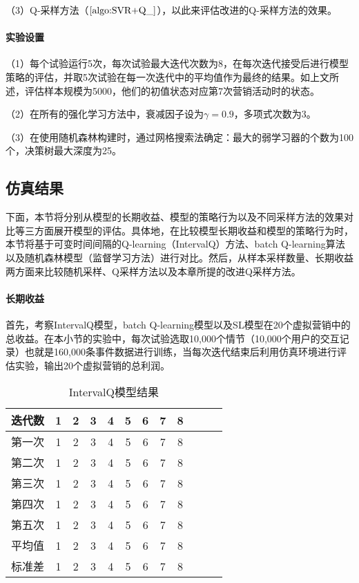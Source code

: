 （3）Q-采样方法（$\ref{algo:SVR+Q_}$），以此来评估改进的Q-采样方法的效果。

\paragraph{实验设置}
（1）每个试验运行5次，每次试验最大迭代次数为8，在每次迭代接受后进行模型策略的评估，并取5次试验在每一次迭代中的平均值作为最终的结果。如上文所述，评估样本规模为5000，他们的初值状态对应第7次营销活动时的状态。

（2）在所有的强化学习方法中，衰减因子设为$\gamma=0.9$，多项式次数为3。

（3）在使用随机森林构建时，通过网格搜索法确定：最大的弱学习器的个数为100个，决策树最大深度为25。

\subsection{仿真结果}
下面，本节将分别从模型的长期收益、模型的策略行为以及不同采样方法的效果对比等三方面展开模型的评估。具体地，在比较模型长期收益和模型的策略行为时，本节将基于可变时间间隔的Q-learning（IntervalQ）方法、batch Q-learning算法以及随机森林模型（监督学习方法）进行对比。然后，从样本采样数量、长期收益两方面来比较随机采样、Q采样方法以及本章所提的改进Q采样方法。

\paragraph{长期收益}
首先，考察IntervalQ模型，batch Q-learning模型以及SL模型在20个虚拟营销中的总收益。在本小节的实验中，每次试验选取10,000个情节（10,000个用户的交互记录）也就是160,000条事件数据进行训练，当每次迭代结束后利用仿真环境进行评估实验，输出20个虚拟营销的总利润。

\begin{table}[htbp]
\centering
\footnotesize
\caption{IntervalQ模型结果}
\label{tab:3result1}
\begin{tabular}{lccccccccccc}  
 \toprule
  迭代数 & 1&2 &3 &4 &5 &6 &7 &8\\
\midrule
  第一次 & 1&2 &3 &4 &5 &6 &7 &8\\
  第二次 & 1&2 &3 &4 &5 &6 &7 &8\\
  第三次 & 1&2 &3 &4 &5 &6 &7 &8\\
  第四次 & 1&2 &3 &4 &5 &6 &7 &8\\
  第五次 & 1&2 &3 &4 &5 &6 &7 &8\\
  平均值 & 1&2 &3 &4 &5 &6 &7 &8\\
  标准差 & 1&2 &3 &4 &5 &6 &7 &8\\
\bottomrule
\end{tabular}
\end{table}


